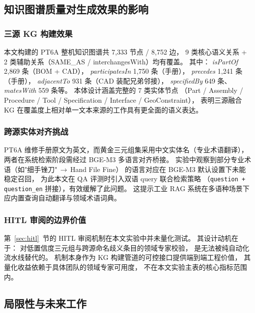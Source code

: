 \subsection{知识图谱质量对生成效果的影响}
\label{sec:disc-kg-quality}

\subsubsection{三源 KG 构建效果}

本文构建的 PT6A 整机知识图谱共 7{,}333 节点 / 8{,}752 边，
9 类核心语义关系 + 2 类辅助关系（SAME\_AS / interchangesWith）均有覆盖。
其中：
\textit{isPartOf} 2{,}869 条（BOM + CAD），
\textit{participatesIn} 1{,}750 条（手册），
\textit{precedes} 1{,}241 条（手册），
\textit{adjacentTo} 931 条（CAD 装配兄弟邻接），
\textit{specifiedBy} 649 条、\textit{matesWith} 559 条等。
本体设计涵盖完整的 7 类实体节点
（Part / Assembly / Procedure / Tool / Specification / Interface / GeoConstraint），
表明三源融合 KG 在覆盖度上相对单一文本来源的工作具有更全面的语义表达。

\subsubsection{跨源实体对齐挑战}

PT6A 维修手册原文为英文，而黄金三元组集采用中文实体名（专业术语翻译），
两者在系统检索阶段需经过 BGE-M3 多语言对齐桥接。
实验中观察到部分专业术语（如"细手锉刀"\,$\rightarrow$\,Hand File Fine）
的语言对应在 BGE-M3 默认设置下未能稳定召回，
为此本文在 QA 评测时引入双语 query 联合检索策略
（\texttt{question + question\_en} 拼接），有效缓解了此问题。
这提示工业 RAG 系统在多语种场景下应内置查询自动翻译与领域术语词典。

\subsubsection{HITL 审阅的边界价值}

第~\ref{sec:hitl}~节的 HITL 审阅机制在本文实验中并未量化测试。
其设计动机在于：
对低置信度三元组与跨源命名歧义条目的领域专家校验，
是无法被纯自动化流水线替代的。
机制本身作为 KG 构建管道的可控接口提供端到端工程价值，
其量化收益依赖于具体团队的领域专家可用度，
不在本文实验主表的核心指标范围内。

\subsection{局限性与未来工作}
\label{sec:disc-limit}


